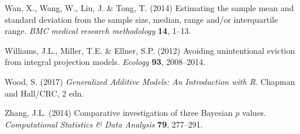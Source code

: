 \documentclass[12pt]{article}
\begin{document}
\begin{spacing}{1.9}
\begin{thebibliography}{62}
Wan, X., Wang, W., Liu, J. \& Tong, T. (2014) Estimating the sample mean and
  standard deviation from the sample size, median, range and/or interquartile
  range. \emph{BMC medical research methodology} \textbf{14}, 1--13.

Williams, J.L., Miller, T.E. \& Ellner, S.P. (2012) Avoiding unintentional
  eviction from integral projection models. \emph{Ecology} \textbf{93},
  2008--2014.
  
  
Wood, S. (2017) \emph{Generalized Additive Models: An Introduction with R}.
  Chapman and Hall/CRC, 2 edn.

Zhang, J.L. (2014) Comparative investigation of three {B}ayesian $p$ values.
  \emph{Computational Statistics \& Data Analysis} \textbf{79}, 277--291.

\end{thebibliography}

\end{spacing} 

\newpage 
\clearpage 
\appendix

\renewcommand{\thetable}{S-\arabic{table}}
\renewcommand{\thefigure}{S-\arabic{figure}}
\renewcommand{\thesection}{S.\arabic{section}}
\renewcommand{\theequation}{S\arabic{equation}}

\setcounter{page}{1}
\setcounter{equation}{0}
\setcounter{figure}{0}
\setcounter{section}{0}
\setcounter{table}{0}
\end{document}
